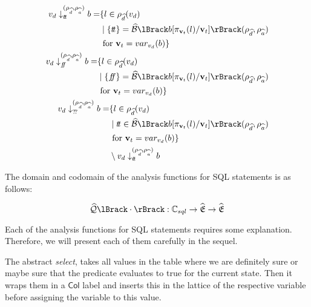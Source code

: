 \begin{align}
    \begin{split}
        v_d \downarrow_{\true}^{(\rho_{\ab{d}}, \rho_{\ab{a}})} b = &\{ l \in \rho_{\ab{d}}(v_d) \\
        &\mid \{ \true \} = \absboolsem{b[\pi_{\mathbf{v}_t}(l)/\mathbf{v}_t]}(\rho_{\ab{d}}, \rho_{\ab{a}}) \\
        &\text{ for } \mathbf{v}_t = var_{v_d}(b) \}
    \end{split}\\
    \begin{split}
        v_d \downarrow_{\false}^{(\rho_{\ab{d}}, \rho_{\ab{a}})} b = &\{ l \in \rho_{\ab{d}}(v_d) \\
        &\mid \{ \false \} = \absboolsem{b[\pi_{\mathbf{v}_t}(l)/\mathbf{v}_t]}(\rho_{\ab{d}}, \rho_{\ab{a}}) \\
        &\text{ for } \mathbf{v}_t = var_{v_d}(b) \}
    \end{split}\\
    \begin{split}
        v_d \downarrow_{\unknown}^{(\rho_{\ab{d}}, \rho_{\ab{a}})} b = &\{ l \in \rho_{\ab{d}}(v_d) \\
        &\mid \true \in \absboolsem{b[\pi_{\mathbf{v}_t}(l)/\mathbf{v}_t]}(\rho_{\ab{d}}, \rho_{\ab{a}}) \\
        &\text{ for } \mathbf{v}_t = var_{v_d}(b) \} \\
        &\setminus v_d \downarrow_{\true}^{(\rho_{\ab{d}}, \rho_{\ab{a}})} b
    \end{split}
\end{align}

The domain and codomain of the analysis functions for SQL statements is as follows:

\begin{equation}
    \abssqlsem{\cdot} : \mathbb{C}_{sql} \rightarrow \ab{\mathfrak{E}} \rightarrow \ab{\mathfrak{E}}\label{eq:equation-docomain-analysis}
\end{equation}

Each of the analysis functions for SQL statements requires some explanation.
Therefore, we will present each of them carefully in the sequel.

The abstract \textit{select}, takes all values in the table where we are definitely sure or maybe sure that the predicate evaluates to true for the current state.
Then it wraps them in a $\mathsf{Col}$ label and inserts this in the lattice of the respective variable before assigning the variable to this value.

